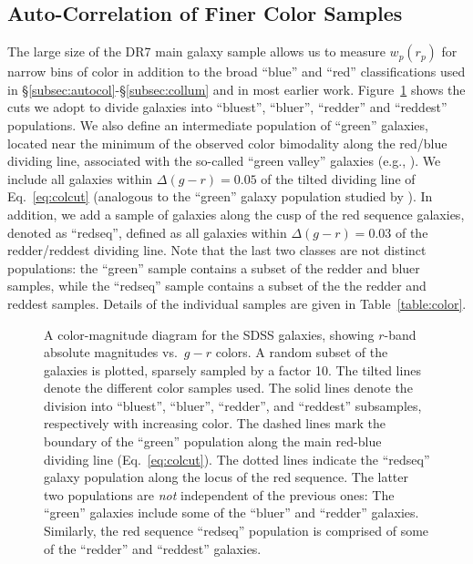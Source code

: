 \documentclass[]{emulateapj}
\newcommand{\wrp}{{w_p(r_p)}}
\begin{document}
\subsection{Auto-Correlation of Finer Color Samples}
\label{subsec:finecol}

The large size of the DR7 main galaxy sample allows us to measure
$\wrp$ for narrow bins of color in addition to the broad ``blue''
and ``red'' classifications used in 
\S\ref{subsec:autocol}-\S\ref{subsec:collum} and in most
earlier work.
Figure~\ref{fig:colormag_brg} shows the cuts we adopt to divide
galaxies into ``bluest'', ``bluer'', ``redder'' and ``reddest''
populations.
We also define an intermediate population of ``green'' galaxies, located
near the minimum of the observed color bimodality along the red/blue
dividing line, associated with the so-called ``green valley'' galaxies (e.g.,
\citealt{wyder07,loh09}). 
We include all galaxies within $\Delta (g-r)=0.05$ of the tilted dividing line 
of Eq.~\ref{eq:colcut} (analogous to the ``green'' galaxy population studied 
by \citealt{coil07}).  
In addition, we add a sample of galaxies along the cusp of the red 
sequence galaxies, denoted as ``redseq'', defined as all galaxies within
$\Delta (g-r)=0.03$ of the redder/reddest dividing line.  Note that the last
two classes are not distinct populations:
the ``green'' sample contains a subset of the redder and bluer 
samples, while the ``redseq'' sample contains a subset of the
the redder and reddest samples.  Details of the individual samples
are given in Table~\ref{table:color}.

\begin{figure}[tbp]
\caption[]{\label{fig:colormag_brg}
A color-magnitude diagram for the SDSS galaxies, showing $r$-band absolute 
magnitudes vs.\ $g-r$ colors. A random subset of the galaxies is plotted,
sparsely sampled by a factor 10. The tilted lines denote the different color 
samples
used. The solid lines denote the division into ``bluest'', ``bluer'', 
``redder'', and ``reddest'' subsamples, respectively with increasing color. 
The dashed
lines mark the boundary of the ``green'' population along the main red-blue
dividing line (Eq.~\ref{eq:colcut}). The dotted lines indicate the 
``redseq'' galaxy population along the locus of the red sequence. The latter
two populations are {\it not} independent of the previous ones: The ``green''
galaxies include  some of the ``bluer'' and ``redder'' galaxies. Similarly, 
the red sequence ``redseq'' population is comprised of some of the ``redder'' 
and ``reddest'' galaxies. 
}
\end{figure}
\end{document}
